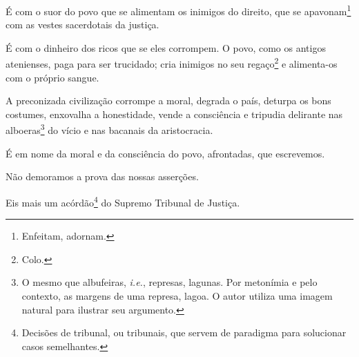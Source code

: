 É com o suor do povo que se alimentam os inimigos do direito, que se
apavonam\footnote{Enfeitam, adornam.} com as vestes sacerdotais da
justiça.

É com o dinheiro dos ricos que se eles corrompem. O povo, como os
antigos atenienses, paga para ser trucidado; cria inimigos no seu
regaço\footnote{Colo.} e alimenta-os com o próprio sangue.

A preconizada civilização corrompe a moral, degrada o país, deturpa os
bons costumes, enxovalha a honestidade, vende a consciência e tripudia
delirante nas alboeras\footnote{ O mesmo que albufeiras,
  \emph{i.e.}, represas, lagunas. Por metonímia e pelo contexto, as
  margens de uma represa, lagoa. O autor utiliza uma imagem natural para
  ilustrar seu argumento.} do vício e nas bacanais da aristocracia.

É em nome da moral e da consciência do povo, afrontadas, que escrevemos.

Não demoramos a prova das nossas asserções.

Eis mais um acórdão\footnote{Decisões de tribunal, ou tribunais, que
  servem de paradigma para solucionar casos semelhantes.} do Supremo
Tribunal de Justiça.

